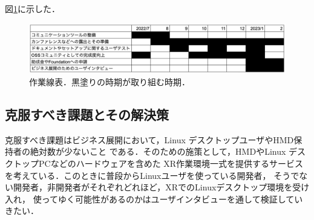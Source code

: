 図\ref{fig:biz-schedule}に示した．

\begin{figure}[htbp]
  \centering
  \includegraphics[keepaspectratio, width=\linewidth]{fig/biz-schedule.png}
  \caption{作業線表．黒塗りの時期が取り組む時期．}
  \label{fig:biz-schedule}
\end{figure}

\subsection{克服すべき課題とその解決策}

克服すべき課題はビジネス展開において，Linux デスクトップユーザやHMD保持者の絶対数が少ないこと
である．そのための施策として，HMDやLinux デスクトップPCなどのハードウェアを含めた
XR作業環境一式を提供するサービスを考えている．このときに普段からLinuxユーザを使っている開発者，
そうでない開発者，非開発者がそれぞれどれほど，XRでのLinuxデスクトップ環境を受け入れ，
使ってゆく可能性があるのかはユーザインタビューを通して検証していきたい．

